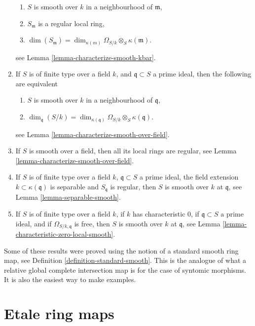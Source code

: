 \begin{enumerate}
\begin{enumerate}
\item $S$ is smooth over $k$ in a neighbourhood of $\mathfrak m$,
\item $S_{\mathfrak m}$ is a regular local ring,
\item $\dim(S_{\mathfrak m}) =
\dim_{\kappa(m)} \Omega_{S/k} \otimes_S \kappa(\mathfrak m)$.
\end{enumerate}
see Lemma \ref{lemma-characterize-smooth-kbar}.
\item If $S$ is of finite type over a field $k$, and
$\mathfrak q \subset S$ a prime ideal,
then the following are equivalent
\begin{enumerate}
\item $S$ is smooth over $k$ in a neighbourhood of $\mathfrak q$,
\item $\dim_{\mathfrak q}(S/k) =
\dim_{\kappa(\mathfrak q)} \Omega_{S/k} \otimes_S \kappa(\mathfrak q)$.
\end{enumerate}
see Lemma \ref{lemma-characterize-smooth-over-field}.
\item If $S$ is smooth over a field, then all its local rings are
regular, see Lemma \ref{lemma-characterize-smooth-over-field}.
\item If $S$ is of finite type over a field $k$,
$\mathfrak q \subset S$ a prime ideal,
the field extension $k \subset \kappa(\mathfrak q)$ is separable
and $S_{\mathfrak q}$ is regular, then $S$ is smooth over $k$ at
$\mathfrak q$, see Lemma \ref{lemma-separable-smooth}.
\item If $S$ is of finite type over a field $k$,
if $k$ has characteristic $0$, if
$\mathfrak q \subset S$ a prime ideal, and if
$\Omega_{S/k, \mathfrak q}$ is free, then $S$ is smooth over $k$ at
$\mathfrak q$, see Lemma \ref{lemma-characteristic-zero-local-smooth}.
\end{enumerate}
Some of these results were proved using the notion of a standard
smooth ring map, see Definition \ref{definition-standard-smooth}.
This is the analogue of what a relative global
complete intersection map is for the case of syntomic morphisms.
It is also the easiest way to make examples.













\section{Etale ring maps}
\label{section-etale}

